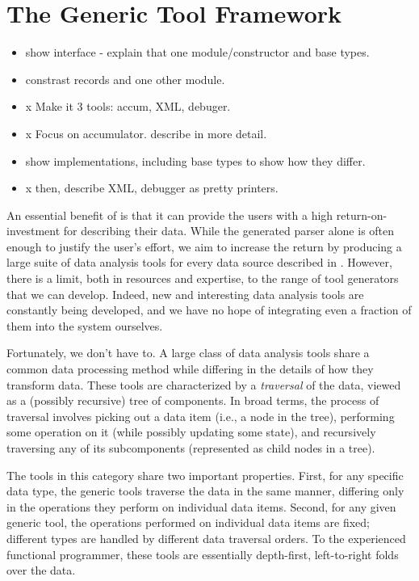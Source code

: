 \section{The Generic Tool Framework}
\label{sec:gen-tool}

\begin{itemize}
\item show interface - explain that one module/constructor and base types.
\item constrast records and one other module.
\item x Make it 3 tools: accum, XML, debuger.
\item x Focus on accumulator. describe in more detail.
\item show implementations,  including base types to show how they differ.
\item x then, describe XML, debugger as pretty printers.
\end{itemize}

An essential benefit of \padsml{} is that it can provide the users
with a high return-on-investment for describing their data. While the
generated parser alone is often enough to justify the user's effort,
we aim to increase the return by producing a large suite of data
analysis tools for every data source described in \padsml{}. However,
there is a limit, both in resources and expertise, to the range of
tool generators that we can develop. Indeed, new and interesting data
analysis tools are constantly being developed, and we have no hope of
integrating even a fraction of them into the \padsml{} system
ourselves.

Fortunately, we don't have to. A large class of data analysis tools
share a common data processing method while differing in the details
of how they transform data. These tools are characterized by a
\emph{traversal} of the data, viewed as a (possibly recursive) tree of
components. In broad terms, the process of traversal involves picking
out a data item (i.e., a node in the tree), performing some operation
on it (while possibly updating some state), and recursively traversing
any of its subcomponents (represented as child nodes in a tree). 

The tools in this category share two important properties. First, for
any specific \padsml{} data type, the generic tools traverse the data
in the same manner, differing only in the operations they perform on
individual data items. Second, for any given generic tool, the operations
performed on individual data items are fixed; different \padsml{}
types are handled by different data traversal orders. To the
experienced functional programmer, these tools are essentially
depth-first, left-to-right folds over the data.

